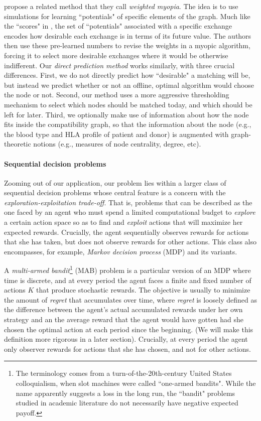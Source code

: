 \citet{dickerson2012dynamic, dickerson2015futurematch} propose a related method that they call \emph{weighted myopia}. The idea is to use simulations for learning ``potentials" of specific elements of the graph. Much like the ``scores" in \citet{awasthi2009online}, the set of ``potentials" associated with a specific exchange encodes how desirable each exchange is in terms of its future value. The authors then use these pre-learned numbers to revise the weights in a myopic algorithm, forcing it to select more desirable exchanges where it would be otherwise indifferent. Our \emph{direct prediction method} works similarly, with three crucial differences. First, we do not directly predict how ``desirable" a matching will be, but instead we predict whether or not an offline, optimal algorithm would choose the node or not. Second, our method uses a more aggressive thresholding mechanism to select which nodes should be matched today, and which should be left for later. Third, we optionally make use of information about how the node fits inside the compatibility graph, so that the information about the node (e.g., the blood type and HLA profile of patient and donor) is augmented with graph-theoretic notions (e.g., measures of node centrality, degree, etc).

\paragraph{Sequential decision problems} Zooming out of our application, our problem lies within a larger class of sequential decision problems whose central feature is a concern with the \emph{exploration-exploitation trade-off}. That is, problems that can be described as the one faced by an agent who must spend a limited computational budget to \emph{explore} a certain action space so as to find and \emph{exploit} actions that will maximize her expected rewards. Crucially, the agent sequentially observes rewards for actions that she has taken, but does not observe rewards for other actions. This class also encompasses, for example, \emph{Markov decision process} (MDP) and its variants.

A \emph{multi-armed bandit}\footnote{The terminology comes from a turn-of-the-20th-century United States colloquialism, when slot machines were called ``one-armed bandits". While the name apparently suggests a loss in the long run, the ``bandit" problems studied in academic literature do not necessarily have negative expected payoff.} (MAB) problem is a particular version of an MDP where time is discrete, and at every period the agent faces a finite and fixed number of actions $K$ that produce stochastic rewards. The objective is usually to minimize the amount of \emph{regret} that accumulates over time, where \emph{regret} is loosely defined as the difference between the agent's actual accumulated rewards under her own strategy and an the average reward that the agent would have gotten had she chosen the optimal action at each period since the beginning. (We will make this definition more rigorous in a later section). Crucially, at every period the agent only observer rewards for actions that she has chosen, and not for other actions.

